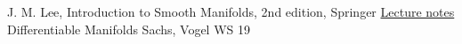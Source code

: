 \documentclass[a4paper,11pt,titlepage, article, oneside]{memoir}
\numberwithin{equation}{section}
\theoremstyle{definition}
\theoremstyle{remark}
\begin{document}

\clearpage
\fancyhf{}
\begin{thebibliography}{AA}
J. M. Lee, Introduction to Smooth Manifolds, 2nd edition, Springer
\href{https://www.physik.uni-muenchen.de/lehre/vorlesungen/wise_19_20/Differentiable-Manifolds/material/skript-TMP.pdf}{Lecture notes} Differentiable Manifolds Sachs, Vogel WS 19
\end{thebibliography}
\end{document}
